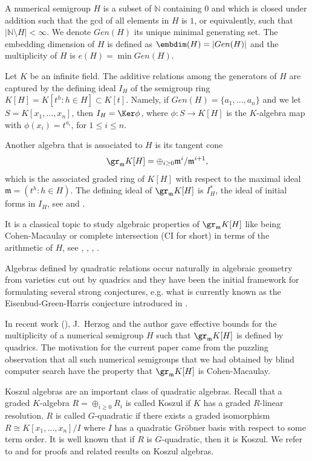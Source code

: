 \documentclass[12pt]{amsart}
\def\NZQ{\mathbb}               %
\def\NN{{\NZQ N}}
\def\frk{\mathfrak}               %
\def\mm{{\frk m}}
\let\to=\rightarrow
\begin{document}
A numerical semigroup $H$ is a subset of $\NN$ containing $0$ and which is closed under addition such that the gcd of all elements in $H$ is $1$, or
equivalently, such that $|\NN \setminus H| < \infty$. We denote  $Gen(H)$ its unique minimal generating set. 
The embedding dimension of $H$ is defined as $\embdim(H)= |Gen(H)|$ 
and the multiplicity of $H$ is $e(H)= \min Gen(H)$.

Let $K$ be an infinite field.
The additive relations among the generators of $H$ are captured by the defining ideal $I_H$ of the semigroup ring $K[H]=K[t^h: h\in H]\subset K[t]$.  
Namely, if $Gen(H)=\{a_1, \dots, a_n\}$ and we let $S=K[x_1, \dots, x_n]$, then $I_H=\Ker \phi$, 
where $\phi:S\to K[H]$ is the $K$-algebra map with $\phi(x_i)=t^{a_i}$, for $1\leq i\leq n$.

Another algebra that is associated to $H$ is its tangent cone  $$\gr_\mm K[H]=\oplus_{i\geq 0} \mm^i/\mm^{i+1},$$
which is the  associated graded ring  of $K[H]$ with respect to the maximal ideal $\mm=(t^h: h\in H)$. 
The defining ideal of $\gr_\mm K[H]$ is $I_H^*$, the ideal of initial forms in $I_H$, see \cite[\S 15.10.3]{Eis} and \cite[\S 3.4]{EH}.


It is a classical topic to study algebraic properties of $\gr_\mm K[H]$ like
being Cohen-Macaulay or complete intersection (CI for short) in terms of the arithmetic of $H$, see \cite{He-reg}, \cite{RV}, \cite{BarF}, \cite{dAMS}.

Algebras defined by quadratic relations occur naturally in algebraic geometry from varieties cut out by quadrics 
and they have been the initial framework for formulating several strong conjectures, 
e.g. what is currently known as the Eisenbud-Green-Harris conjecture introduced in \cite[Section 4]{EGH-highCastelnuovo}.

In recent work (\cite{HeS-quad}),  J.~Herzog and the author gave effective bounds for the multiplicity of a 
numerical semigroup $H$  such that $\gr_\mm K[H]$ is defined by quadrics.
The motivation for the current  paper came from the puzzling observation that all such numerical semigroups that 
we had obtained by blind computer search  have the property that $\gr_\mm K[H]$ is Cohen-Macaulay. 

Koszul algebras are an important class of quadratic algebras. 
Recall that a graded $K$-algebra $R= \oplus_{i\geq 0} R_i$ is called Koszul if $K$ has a graded $R$-linear resolution. 
$R$ is called $G$-quadratic if there exists a graded isomorphism  
$R\cong K[x_1,\dots, x_n]/I$ where $I$ has a quadratic Gr\"obner basis with respect to some term order.
It is well known that if $R$ is $G$-quadratic, then it is Koszul.
We refer to \cite{CdNR} and \cite{EH} for proofs and related results on Koszul algebras.
\end{document}
